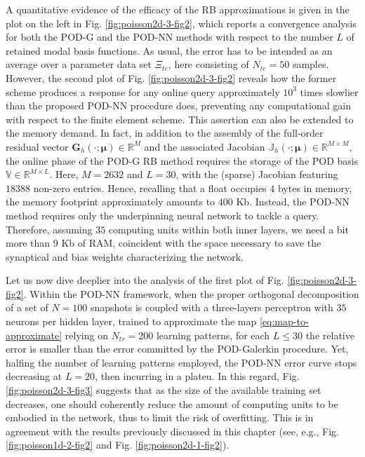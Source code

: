 \documentclass[12pt, a4paper, twoside, openright, notitlepage]{report}
\numberwithin{equation}{chapter}
\theoremstyle{theorem}
\theoremstyle{definition}
\theoremstyle{remark}
\theoremstyle{proposition}
\numberwithin{figure}{chapter}
\newcommand{\bg}[1]{\boldsymbol{#1}}
\begin{document}
		A quantitative evidence of the efficacy of the RB approximations is given in the plot on the left in Fig. \ref{fig:poisson2d-3-fig2}, which reports a convergence analysis for both the POD-G and the POD-NN methods with respect to the number $L$ of retained modal basis functions. As usual, the error has to be intended as an average over a parameter data set $\Xi_{te}$, here consisting of $N_{te} = 50$ samples. However, the second plot of Fig. \ref{fig:poisson2d-3-fig2} reveals how the former scheme produces a response for any online query approximately $10^3$ times slowlier than the proposed POD-NN procedure does, preventing any computational gain with respect to the finite element scheme. This assertion can also be extended to the memory demand. In fact, in addition to the assembly of the full-order residual vector $\mathbf{G}_h(\cdot;\bg{\mu}) \in \mathbb{R}^M$ and the associated Jacobian $\mathbb{J}_h(\cdot;\bg{\mu}) \in \mathbb{R}^{M \times M}$, the online phase of the POD-G RB method requires the storage of the POD basis $\mathbb{V} \in \mathbb{R}^{M \times L}$. Here, $M = 2632$ and $L = 30$, with the (sparse) Jacobian featuring $18388$ non-zero entries. Hence, recalling that a float occupies $4$ bytes in memory, the memory footprint approximately amounts to $400$ Kb. Instead, the POD-NN method requires only the underpinning neural network to tackle a query. Therefore, assuming $35$ computing units within both inner layers, we need a bit more than $9$ Kb of RAM, coincident with the space necessary to save the synaptical and bias weights characterizing the network.
		
		Let us now dive deeplier into the analysis of the first plot of Fig. \ref{fig:poisson2d-3-fig2}. Within the POD-NN framework, when the proper orthogonal decomposition of a set of $N = 100$ snapshots is coupled with a three-layers perceptron with $35$ neurons per hidden layer, trained to approximate the map \eqref{eq:map-to-approximate} relying on $N_{tr} = 200$ learning patterns, for each $L \leq 30$ the relative error is smaller than the error committed by the POD-Galerkin procedure. Yet, halfing the number of learning patterns employed, the POD-NN error curve stops decreasing at $L = 20$, then incurring in a plateu. In this regard, Fig. \ref{fig:poisson2d-3-fig3} suggests that as the size of the available training set decreases, one should coherently reduce the amount of computing units to be embodied in the network, thus to limit the risk of overfitting. This is in agreement with the results previously discussed in this chapter (see, e.g., Fig. \ref{fig:poisson1d-2-fig2} and Fig. \ref{fig:poisson2d-1-fig2}).
						
\end{document}

